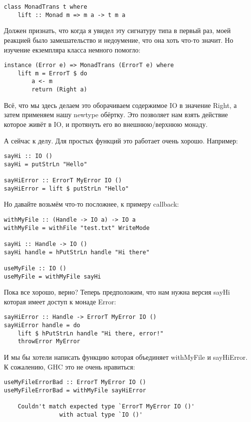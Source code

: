 \begin{lstlisting}
class MonadTrans t where
    lift :: Monad m => m a -> t m a
\end{lstlisting}

Должен признать, что когда я увидел эту сигнатуру типа в первый раз, моей
реакцией было замешательство и недоумение, что она хоть что-то значит. Но
изучение екземпляра класса немного помогло:

\begin{lstlisting}
instance (Error e) => MonadTrans (ErrorT e) where
    lift m = ErrorT $ do
        a <- m
        return (Right a)
\end{lstlisting}

Всё, что мы здесь делаем это оборачиваем содержимое IO в значение Right, а
затем применяем нашу newtype обёртку. Это позволяет нам взять действие которое
живёт в IO, и протянуть его во внешнюю/верхнюю монаду.

А сейчас к делу. Для простых функций это работает очень хорошо. Например:

\begin{lstlisting}
sayHi :: IO ()
sayHi = putStrLn "Hello"

sayHiError :: ErrorT MyError IO ()
sayHiError = lift $ putStrLn "Hello"
\end{lstlisting}

Но давайте возьмём что-то посложнее, к примеру callback:

\begin{lstlisting}
withMyFile :: (Handle -> IO a) -> IO a
withMyFile = withFile "test.txt" WriteMode

sayHi :: Handle -> IO ()
sayHi handle = hPutStrLn handle "Hi there"

useMyFile :: IO ()
useMyFile = withMyFile sayHi
\end{lstlisting}

Пока все хорошо, верно? Теперь предположим, что нам нужна версия sayHi которая
имеет доступ к монаде Error:

\begin{lstlisting}
sayHiError :: Handle -> ErrorT MyError IO ()
sayHiError handle = do
    lift $ hPutStrLn handle "Hi there, error!"
    throwError MyError
\end{lstlisting}

И мы бы хотели написать функцию которая объединяет withMyFile и sayHiError. К
сожалению, GHC это не очень нравиться:

\begin{lstlisting}
useMyFileErrorBad :: ErrorT MyError IO ()
useMyFileErrorBad = withMyFile sayHiError

    Couldn't match expected type `ErrorT MyError IO ()'
                with actual type `IO ()'
\end{lstlisting}

